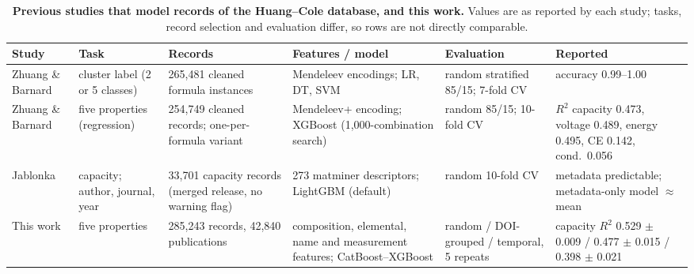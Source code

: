 \documentclass[3p]{elsarticle}
\begin{document}
\clearpage
\begin{table}[H]
    \centering\small
    \caption{\textbf{Previous studies that model records of the Huang--Cole database, and this work.} Values are as reported by each study; tasks, record selection and evaluation differ, so rows are not directly comparable.}
    \label{tab:previous}
    \begin{tabular}{@{}p{2.6cm} p{2.6cm} p{3.0cm} p{2.4cm} p{2.6cm} p{2.2cm}@{}}
        \toprule
        Study & Task & Records & Features / model & Evaluation & Reported \\
        \midrule
        Zhuang \& Barnard \cite{zhuang2024classification} & cluster label (2 or 5 classes) & 265,481 cleaned formula instances & Mendeleev encodings; LR, DT, SVM & random stratified 85/15; 7-fold CV & accuracy 0.99--1.00 \\
        Zhuang \& Barnard \cite{zhuang2024property} & five properties (regression) & 254,749 cleaned records; one-per-formula variant & Mendeleev+ encoding; XGBoost (1,000-combination search) & random 85/15; 10-fold CV & $R^2$ capacity 0.473, voltage 0.489, energy 0.495, CE 0.142, cond.\ 0.056 \\
        Jablonka \cite{jablonka2026clever} & capacity; author, journal, year & 33,701 capacity records (merged release, no warning flag) & 273 matminer descriptors; LightGBM (default) & random 10-fold CV & metadata predictable; metadata-only model $\approx$ mean \\
        \midrule
        This work & five properties & 285,243 records, 42,840 publications & composition, elemental, name and measurement features; CatBoost--XGBoost & random / DOI-grouped / temporal, 5 repeats & capacity $R^2$ 0.529 $\pm$ 0.009 / 0.477 $\pm$ 0.015 / 0.398 $\pm$ 0.021 \\
        \bottomrule
    \end{tabular}
\end{table}
\end{document}
